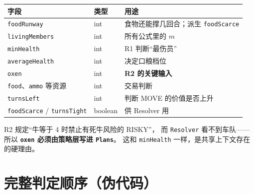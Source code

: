 \documentclass[UTF8,11pt,a4paper]{ctexart}
\begin{document}
\begin{center}
\begin{tabular}{@{}p{4.0cm}p{2.4cm}p{8.2cm}@{}}
\toprule
\textbf{字段} & \textbf{类型} & \textbf{用途} \\
\midrule
\texttt{foodRunway} & int & 食物还能撑几回合；派生 \texttt{foodScarce} \\
\texttt{livingMembers} & int & 所有公式里的 $m$ \\
\texttt{minHealth} & int & R1 判断“最伤员” \\
\texttt{averageHealth} & int & 决定口粮档位 \\
\texttt{oxen} & int & \textbf{R2 的关键输入} \\
\texttt{food}、\texttt{ammo} 等资源 & int & 交易判断 \\
\texttt{turnsLeft} & int & 判断 MOVE 的价值是否上升 \\
\texttt{foodScarce} / \texttt{turnsTight} & boolean & 供 Resolver 用 \\
\bottomrule
\end{tabular}
\end{center}

\begin{keybox}[title={v1.1 新增：\texttt{oxen} 必须进 \texttt{Plans}}]
R2 规定“牛等于 4 时禁止有死牛风险的 RISKY”，
而 \texttt{Resolver} 看不到车队——所以 \textbf{\texttt{oxen} 必须由策略层写进 \texttt{Plans}}。
这和 \texttt{minHealth} 一样，是共享上下文存在的硬理由。
\end{keybox}

\section{完整判定顺序（伪代码）}
\end{document}

